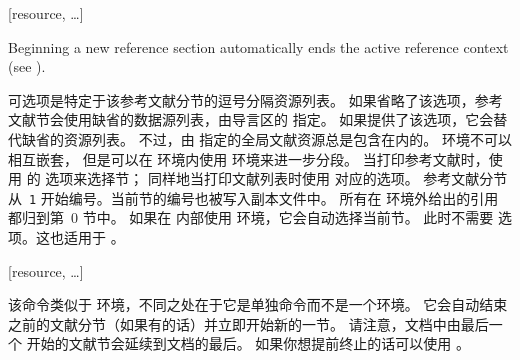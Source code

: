 \begin{ltxsyntax}

[resource, \dots]


 Beginning a new reference section automatically ends the active reference context (see ).

可选项是特定于该参考文献分节的逗号分隔资源列表。
如果省略了该选项，参考文献节会使用缺省的数据源列表，由导言区的  指定。
如果提供了该选项，它会替代缺省的资源列表。
不过，由  指定的全局文献资源总是包含在内的。
 环境不可以相互嵌套，
但是可以在  环境内使用  环境来进一步分段。
当打印参考文献时，使用  的  选项来选择节；
同样地当打印文献列表时使用  对应的选项。
参考文献分节从~\texttt{1} 开始编号。当前节的编号也被写入副本文件中。
所有在  环境外给出的引用都归到第~0 节中。
如果在  内部使用  环境，它会自动选择当前节。
此时不需要  选项。这也适用于 。

[resource, \dots]


该命令类似于  环境，不同之处在于它是单独命令而不是一个环境。
它会自动结束之前的文献分节（如果有的话）并立即开始新的一节。
请注意，文档中由最后一个  开始的文献节会延续到文档的最后。
如果你想提前终止的话可以使用 。

\end{ltxsyntax}

